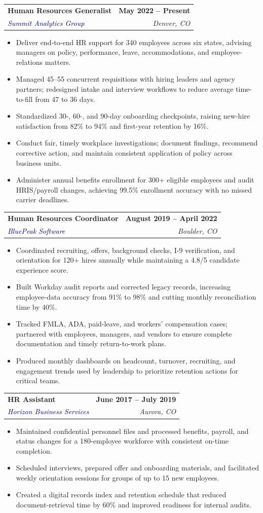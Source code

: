 \documentclass[10pt,letterpaper]{article}
\makeatletter
\newcommand{\role}[4]{%
  \begin{tabularx}{\textwidth}{@{}Xr@{}}
    \textbf{#1} & \textbf{#2} \\
    \textcolor{navy}{\textit{#3}} & \textcolor{slate}{\textit{#4}}
  \end{tabularx}%
}
\makeatother
\begin{document}
\role{Human Resources Generalist}{May 2022 -- Present}{Summit Analytics Group}{Denver, CO}
\begin{itemize}
  \item Deliver end-to-end HR support for 340 employees across six states, advising managers on policy, performance, leave, accommodations, and employee-relations matters.
  \item Managed 45--55 concurrent requisitions with hiring leaders and agency partners; redesigned intake and interview workflows to reduce average time-to-fill from 47 to 36 days.
  \item Standardized 30-, 60-, and 90-day onboarding checkpoints, raising new-hire satisfaction from 82\% to 94\% and first-year retention by 16\%.
  \item Conduct fair, timely workplace investigations; document findings, recommend corrective action, and maintain consistent application of policy across business units.
  \item Administer annual benefits enrollment for 300+ eligible employees and audit HRIS/payroll changes, achieving 99.5\% enrollment accuracy with no missed carrier deadlines.
\end{itemize}

\vspace{3pt}
\role{Human Resources Coordinator}{August 2019 -- April 2022}{BluePeak Software}{Boulder, CO}
\begin{itemize}
  \item Coordinated recruiting, offers, background checks, I-9 verification, and orientation for 120+ hires annually while maintaining a 4.8/5 candidate experience score.
  \item Built Workday audit reports and corrected legacy records, increasing employee-data accuracy from 91\% to 98\% and cutting monthly reconciliation time by 40\%.
  \item Tracked FMLA, ADA, paid-leave, and workers' compensation cases; partnered with employees, managers, and vendors to ensure complete documentation and timely return-to-work plans.
  \item Produced monthly dashboards on headcount, turnover, recruiting, and engagement trends used by leadership to prioritize retention actions for critical teams.
\end{itemize}

\vspace{3pt}
\role{HR Assistant}{June 2017 -- July 2019}{Horizon Business Services}{Aurora, CO}
\begin{itemize}
  \item Maintained confidential personnel files and processed benefits, payroll, and status changes for a 180-employee workforce with consistent on-time completion.
  \item Scheduled interviews, prepared offer and onboarding materials, and facilitated weekly orientation sessions for groups of up to 15 new employees.
  \item Created a digital records index and retention schedule that reduced document-retrieval time by 60\% and improved readiness for internal audits.
\end{itemize}
\end{document}
